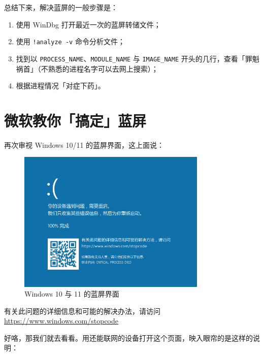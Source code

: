 总结下来，解决蓝屏的一般步骤是：

\begin{enumerate}
  \item 使用 WinDbg 打开最近一次的蓝屏转储文件；
  \item 使用 \verb|!analyze -v| 命令分析文件；
  \item 找到以 \verb|PROCESS_NAME|、\verb|MODULE_NAME| 与 \verb|IMAGE_NAME| 开头的几行，查看「罪魁祸首」（不熟悉的进程名字可以去网上搜索）；
  \item 根据进程情况「对症下药」。
\end{enumerate}

\section{微软教你「搞定」蓝屏}

\begin{note}
\end{note}

再次审视 Windows 10/11 的蓝屏界面，这上面说：

\begin{figure}[htb!]
  \centering
  \includegraphics[width=9cm]{assets/Win-10-BSoD.png}
  \caption{Windows 10 与 11 的蓝屏界面}
  \label{Win-10-BSoD-2}
\end{figure}


\begin{note}
  有关此问题的详细信息和可能的解决办法，请访问 \url{https://www.windows.com/stopcode}
\end{note}

好咯，那我们就去看看。用还能联网的设备打开这个页面，映入眼帘的是这样的说明：

